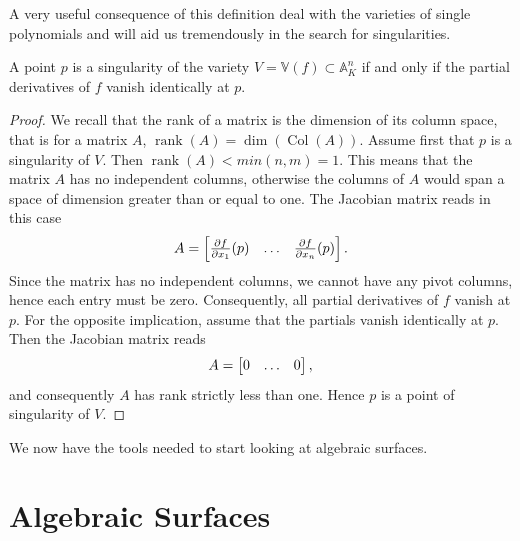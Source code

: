 \documentclass{article}
\newcommand{\A}{\ensuremath{\mathbb{A}}}
\newcommand{\V}{\ensuremath{\mathbb{V}}}
\DeclareMathOperator{\Col}{Col}
\DeclareMathOperator{\rank}{rank}
\begin{document}
    A very useful consequence of this definition deal with the varieties of
    single polynomials and will aid us tremendously in the search for
    singularities.
    \begin{corollary}
        \label{crl:single_poly}
        A point $p$ is a singularity of the variety $V = \V(f) \subset \A_K^n$
        if and only if the partial derivatives of $f$ vanish identically at
        $p$. 
    \end{corollary}
    \begin{proof}
        We recall that the rank of a matrix is the dimension of its column
        space, that is for a matrix $A$, $\rank(A) = \dim(\Col(A))$.  Assume
        first that $p$ is a singularity of $V$. Then $\rank(A) < min(n, m) =
        1$. This means that the matrix $A$ has no independent columns,
        otherwise the columns of $A$ would span a space of dimension greater
        than or equal to one. The Jacobian matrix reads in this case
        \begin{equation}
            \notag
            A = \begin{bmatrix}
                \frac{\partial f}{\partial x_1}(p) & \hdots & \frac{\partial f}{\partial x_n}(p)
            \end{bmatrix}.
        \end{equation}
        Since the matrix has no independent columns, we cannot have any pivot
        columns, hence each entry must be zero. Consequently, all partial
        derivatives of $f$ vanish at $p$.  For the opposite implication, assume
        that the partials vanish identically at $p$. Then the Jacobian matrix
        reads
        \begin{equation}
            \notag
            A = \begin{bmatrix}
                0 & \hdots & 0
            \end{bmatrix},
        \end{equation} and consequently $A$ has rank strictly less than one.
        Hence $p$ is a point of singularity of $V$.
    \end{proof}

    We now have the tools needed to start looking at algebraic surfaces.
    
    \section{Algebraic Surfaces}
    \label{sec:algebraic_surfaces}
    
\end{document}

